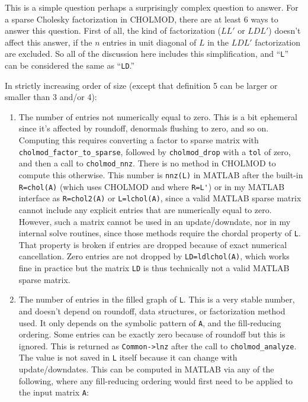\documentclass[11pt]{article}
\begin{document}
This is a simple question perhaps a surprisingly complex question to answer.
For a sparse Cholesky factorization in CHOLMOD, there are at least 6 ways to
answer this question.  First of all, the kind of factorization ($LL'$ or
$LDL'$) doesn't affect this answer, if the $n$ entries in unit diagonal of $L$
in the $LDL'$ factorization are excluded.  So all of the discussion here
includes this simplification, and ``\verb'L''' can be considered the same
as ``\verb'LD'.''

In strictly increasing order of size (except that definition 5 can be larger or
smaller than 3 and/or 4):

\begin{enumerate}

\item
The number of entries not numerically equal to zero. This is a bit ephemeral
since it's affected by roundoff, denormals flushing to zero, and so on.
Computing this requires converting a factor to sparse matrix with
\verb'cholmod_factor_to_sparse', followed by \verb'cholmod_drop' with a
\verb'tol' of zero, and then a call to \verb'cholmod_nnz'.  There is no method
in CHOLMOD to compute this otherwise.  This number is \verb'nnz(L)' in MATLAB
after the built-in \verb'R=chol(A)' (which uses CHOLMOD and where \verb"R=L'")
or in my MATLAB interface as \verb'R=chol2(A)' or \verb'L=lchol(A)', since a
valid MATLAB sparse matrix cannot include any explicit entries that are
numerically equal to zero.  However, such a matrix cannot be used in an
update/downdate, nor in my internal solve routines, since those methods require
the chordal property of \verb'L'.  That property is broken if entries are
dropped because of exact numerical cancellation.  Zero entries are not dropped
by \verb'LD=ldlchol(A)', which works fine in practice but the matrix \verb'LD'
is thus technically not a valid MATLAB sparse matrix.

\item
The number of entries in the filled graph of \verb'L'. This is a very stable
number, and doesn't depend on roundoff, data structures, or factorization
method used.  It only depends on the symbolic pattern of \verb'A', and the
fill-reducing ordering.  Some entries can be exactly zero because of roundoff
but this is ignored.  This is returned as \verb'Common->lnz' after the call to
\verb'cholmod_analyze'.  The value is not saved in \verb'L' itself because it
can change with update/downdates.  This can be computed in MATLAB via any
of the following, where any fill-reducing ordering would first need to be
applied to the input matrix \verb'A':


\end{enumerate}
\end{document}
